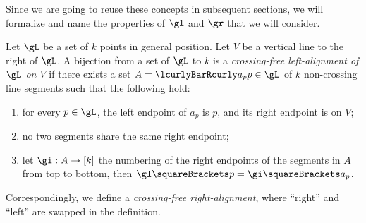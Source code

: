 \documentclass[10pt, a4paper, twoside]{basestyle}
\begin{document}
Since we are going to reuse these concepts in subsequent sections, we will formalize and name the properties of
$\gl$ and $\gr$ that we will consider.
\begin{definition}
Let $\gL$ be a set of $k$ points in general position. Let $V$ be a vertical line to the right of $\gL$.
A bijection from a set of $\gL$ to $k$ is a \emph{crossing-free left-alignment of $\gL$ on $V$} if
there exists a set $A=\setst{a_p}{p\in\gL}$ of $k$ non-crossing line segments such that
the following hold:
\begin{enumerate}
\item for every $p\in\gL$, the left endpoint of $a_p$ is $p$, and its right endpoint is on $V$;
\item no two segments share the same right endpoint;
\item let $\FunctionSpec \gi A {[k]}$ the numbering of the right endpoints of the segments in
$A$ from top to bottom, then $\gl\of p = \gi\of{a_p}$.
\end{enumerate}

Correspondingly, we define a \emph{crossing-free right-alignment}, where ``right'' and ``left'' are swapped in the
definition.
\end{definition}
\end{document}
